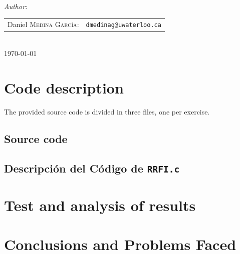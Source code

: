 \documentclass[12pt]{article}
\begin{document}
\begin{titlepage}
\emph{Author:}\\[0.7cm]

\begin{tabular}{rl}
    Daniel \textsc{Medina García}: &\texttt{dmedinag@uwaterloo.ca}\\
\end{tabular}\\[2cm]



{\large \today}\\[3cm] %



\vfill %

\end{titlepage}

\tableofcontents %

\newpage

\section{Code description} %

The provided source code is divided in three files, one per exercise.

\subsection{Source code}

\newpage

\subsection{Descripción del Código de \texttt{RRFI.c}}

\newpage

\section{Test and analysis of results}

\newpage

\section{Conclusions and Problems Faced}
\end{document}
